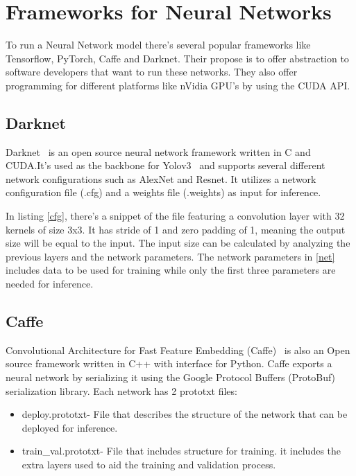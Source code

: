 
 \section{Frameworks for Neural Networks}
 \label{section:darknet}

\quad To run a Neural Network model there's several popular frameworks like Tensorflow, PyTorch, Caffe and Darknet.
Their propose is to offer abstraction to software developers that want to run these networks. They also offer
programming for different platforms like nVidia GPU's by using the CUDA API.


\subsection{Darknet}

\quad Darknet~\cite{darknet} is an open source neural network framework written in C and CUDA.It's used as the backbone for Yolov3~\cite{yolov3} and supports several different network configurations such as AlexNet and Resnet.
 It utilizes a network configuration
file (.cfg) and a weights file (.weights) as input for inference.



In listing \ref{cfg}, there's a snippet of the file featuring
a convolution layer with 32 kernels of size 3x3. It has stride of 1 and zero padding of 1, meaning the output size will
be equal to the input. The input size can be calculated by analyzing the previous layers and the network parameters. The network parameters in \ref{net} includes
data to be used for training while only the first three parameters are needed for inference.




\subsection{Caffe}


\quad Convolutional Architecture for Fast Feature Embedding (Caffe)~\cite{caffe} is also an Open source framework written in C++ with interface for Python.
Caffe exports a neural network by serializing it using the Google Protocol Buffers (ProtoBuf) serialization library. Each network has 2 prototxt files:
\begin{itemize}
    \item  deploy.prototxt- File that describes the structure of the network that can be deployed for inference.
    \item  train\_val.prototxt- File that includes structure for training. 
    it includes the extra layers used to aid the training and validation process.
\end{itemize}

